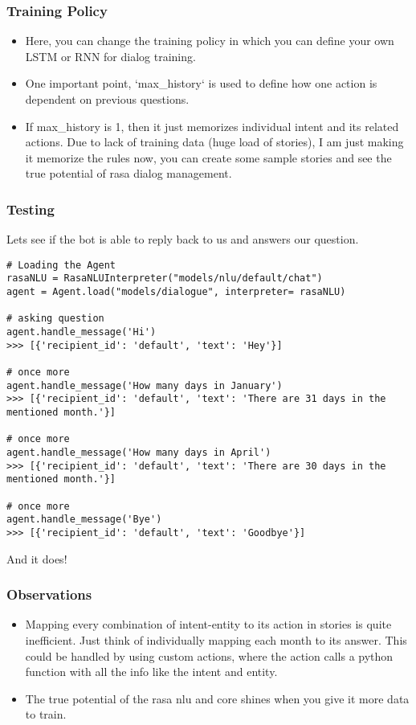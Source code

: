  \begin{frame}[fragile]\frametitle{Training Policy}

\begin{itemize}
\item Here, you can change the training policy in which you can define your own LSTM or RNN for dialog training. 
\item One important point, ‘max\_history‘ is used to define how one action is dependent on previous questions. 
\item If max\_history is 1, then it just memorizes individual intent and its related actions. Due to lack of training data (huge load of stories), I am just making it memorize the rules now, you can create some sample stories and see the true potential of rasa dialog management.
\end{itemize}
\end{frame}

 \begin{frame}[fragile]\frametitle{Testing}
Lets see if the bot is able to reply back to us and answers our question.

\begin{lstlisting}
# Loading the Agent
rasaNLU = RasaNLUInterpreter("models/nlu/default/chat")
agent = Agent.load("models/dialogue", interpreter= rasaNLU)

# asking question
agent.handle_message('Hi')
>>> [{'recipient_id': 'default', 'text': 'Hey'}]

# once more
agent.handle_message('How many days in January')
>>> [{'recipient_id': 'default', 'text': 'There are 31 days in the mentioned month.'}]

# once more
agent.handle_message('How many days in April')
>>> [{'recipient_id': 'default', 'text': 'There are 30 days in the mentioned month.'}]

# once more
agent.handle_message('Bye')
>>> [{'recipient_id': 'default', 'text': 'Goodbye'}]
\end{lstlisting}

And it does!
\end{frame}

 \begin{frame}[fragile]\frametitle{Observations}

\begin{itemize}
\item Mapping every combination of intent-entity to its action in stories is quite inefficient. Just think of individually mapping each month to its answer. This could be handled by using custom actions, where the action calls a python function with all the info like the intent and entity.
\item The true potential of the rasa nlu and core shines when you give it more data to train.
\end{itemize}
\end{frame}


